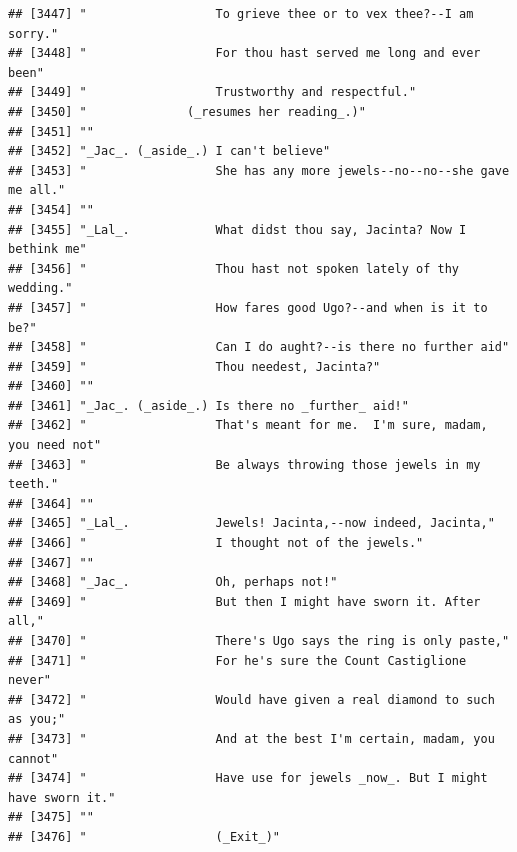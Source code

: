 \documentclass{article}\usepackage[]{graphicx}\usepackage[]{color}
\makeatletter
\newenvironment{kframe}{%
 \def\at@end@of@kframe{}%
 \ifinner\ifhmode%
  \def\at@end@of@kframe{\end{minipage}}%
  \begin{minipage}{\columnwidth}%
 \fi\fi%
 \def\FrameCommand##1{\hskip\@totalleftmargin \hskip-\fboxsep
 \colorbox{shadecolor}{##1}\hskip-\fboxsep
     \hskip-\linewidth \hskip-\@totalleftmargin \hskip\columnwidth}%
 \MakeFramed {\advance\hsize-\width
   \@totalleftmargin\z@ \linewidth\hsize
   \@setminipage}}%
 {\par\unskip\endMakeFramed%
 \at@end@of@kframe}
\newenvironment{knitrout}{}{} %
\makeatother
\begin{document}
\begin{knitrout}
\begin{kframe}
\begin{verbatim}
## [3447] "                  To grieve thee or to vex thee?--I am sorry."               
## [3448] "                  For thou hast served me long and ever been"                
## [3449] "                  Trustworthy and respectful."                               
## [3450] "              (_resumes her reading_.)"                                      
## [3451] ""                                                                            
## [3452] "_Jac_. (_aside_.) I can't believe"                                           
## [3453] "                  She has any more jewels--no--no--she gave me all."         
## [3454] ""                                                                            
## [3455] "_Lal_.            What didst thou say, Jacinta? Now I bethink me"            
## [3456] "                  Thou hast not spoken lately of thy wedding."               
## [3457] "                  How fares good Ugo?--and when is it to be?"                
## [3458] "                  Can I do aught?--is there no further aid"                  
## [3459] "                  Thou needest, Jacinta?"                                    
## [3460] ""                                                                            
## [3461] "_Jac_. (_aside_.) Is there no _further_ aid!"                                
## [3462] "                  That's meant for me.  I'm sure, madam, you need not"       
## [3463] "                  Be always throwing those jewels in my teeth."              
## [3464] ""                                                                            
## [3465] "_Lal_.            Jewels! Jacinta,--now indeed, Jacinta,"                    
## [3466] "                  I thought not of the jewels."                              
## [3467] ""                                                                            
## [3468] "_Jac_.            Oh, perhaps not!"                                          
## [3469] "                  But then I might have sworn it. After all,"                
## [3470] "                  There's Ugo says the ring is only paste,"                  
## [3471] "                  For he's sure the Count Castiglione never"                 
## [3472] "                  Would have given a real diamond to such as you;"           
## [3473] "                  And at the best I'm certain, madam, you cannot"            
## [3474] "                  Have use for jewels _now_. But I might have sworn it."     
## [3475] ""                                                                            
## [3476] "                  (_Exit_)"                                                  

\end{verbatim}
\end{kframe}
\end{knitrout}
\end{document}
